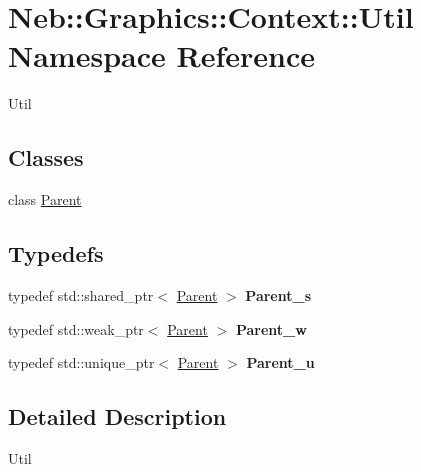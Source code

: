 \hypertarget{namespaceNeb_1_1Graphics_1_1Context_1_1Util}{\section{\-Neb\-:\-:\-Graphics\-:\-:\-Context\-:\-:\-Util \-Namespace \-Reference}
\label{namespaceNeb_1_1Graphics_1_1Context_1_1Util}
}


\-Util  


\subsection*{\-Classes}
\begin{DoxyCompactItemize}
\item 
class \hyperlink{classNeb_1_1Graphics_1_1Context_1_1Util_1_1Parent}{\-Parent}
\end{DoxyCompactItemize}
\subsection*{\-Typedefs}
\begin{DoxyCompactItemize}
\item 
\hypertarget{namespaceNeb_1_1Graphics_1_1Context_1_1Util_a6df4a46222ac4fb06e0630a89448fd5b}{typedef std\-::shared\-\_\-ptr$<$ \hyperlink{classNeb_1_1Graphics_1_1Context_1_1Util_1_1Parent}{\-Parent} $>$ {\bfseries \-Parent\-\_\-s}}\label{namespaceNeb_1_1Graphics_1_1Context_1_1Util_a6df4a46222ac4fb06e0630a89448fd5b}

\item 
\hypertarget{namespaceNeb_1_1Graphics_1_1Context_1_1Util_a75157c4132e7e14b960043e8d2d0cef8}{typedef std\-::weak\-\_\-ptr$<$ \hyperlink{classNeb_1_1Graphics_1_1Context_1_1Util_1_1Parent}{\-Parent} $>$ {\bfseries \-Parent\-\_\-w}}\label{namespaceNeb_1_1Graphics_1_1Context_1_1Util_a75157c4132e7e14b960043e8d2d0cef8}

\item 
\hypertarget{namespaceNeb_1_1Graphics_1_1Context_1_1Util_abffe8833279569d4bf50ca054ff849cd}{typedef std\-::unique\-\_\-ptr$<$ \hyperlink{classNeb_1_1Graphics_1_1Context_1_1Util_1_1Parent}{\-Parent} $>$ {\bfseries \-Parent\-\_\-u}}\label{namespaceNeb_1_1Graphics_1_1Context_1_1Util_abffe8833279569d4bf50ca054ff849cd}

\end{DoxyCompactItemize}


\subsection{\-Detailed \-Description}
\-Util 